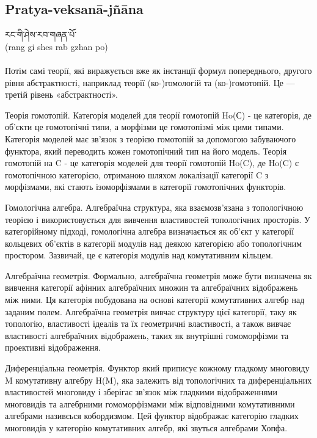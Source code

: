 \subsection*{Pratya-veksanā-jñāna}

\ti རང་གི་ཤེས་རབ་གཞན་པོ་ 
\\
\ua (rang gi shes rab gzhan po)\\
\\
Потім самі теорії, які виражується вже як інстанції формул попереднього, другого рівня абстрактності, наприклад теорії (ко-)гомологій та (ко-)гомотопій. Це — третій рівень «абстрактності».

Теорія гомотопій. Категорія моделей для теорії гомотопій Ho(С) - це категорія, де об'єкти це гомотопічні типи, а морфізми це гомотопізмі між цими типами. Категорія моделей має зв'язок з теорією гомотопій за допомогою забуваючого функтора, який переводить кожен гомотопічний тип на його модель. Теорія гомотопій на C - це категорія моделей для теорії гомотопій Ho(C), де Ho(C) є гомотопічною категорією, отриманою шляхом локалізації категорії C з морфізмами, які стають ізоморфізмами в категорії гомотопічних функторів.

Гомологічна алгебра. Алгебраїчна структура, яка взаємозв'язана з топологічною теорією і використовується для вивчення властивостей топологічних просторів. У категорійному підході, гомологічна алгебра визначається як об'єкт у категорії кольцевих об'єктів в категорії модулів над деякою категорією або топологічним простором. Зазвичай, це є категорія модулів над комутативним кільцем.

Алгебраїчна геометрія. Формально, алгебраїчна геометрія може бути визначена як вивчення категорії афінних алгебраїчних множин та алгебраїчних відображень між ними. Ця категорія побудована на основі категорії комутативних алгебр над заданим полем. Алгебраїчна геометрія вивчає структуру цієї категорії, таку як топологію, властивості ідеалів та їх геометричні властивості, а також вивчає властивості алгебраїчних відображень, таких як внутрішні гомоморфізми та проективні відображення.

Диференціальна геометрія. Функтор який приписує кожному гладкому многовиду M комутативну алгебру H(M), яка залежить від топологічних та диференціальних властивостей многовиду і зберігає зв'язок між гладкими відображеннями многовидів та алгебрними гомоморфізмами між відповідними комутативними алгебрами називєься кобордизмом. Цей функтор відображає категорію гладких многовидів у категорію комутативних алгебр, які звуться алгебрами Хопфа.

